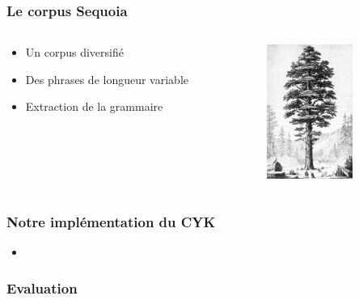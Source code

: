 \documentclass{beamer}
\begin{document}
\begin{frame}
  \frametitle{Le corpus Sequoia}
  \begin{columns}
  \begin{column}{0.5\textwidth}
    \begin{itemize}
     \item{ Un corpus diversifié}
     \item{ Des phrases de longueur variable}
     \item{ Extraction de la grammaire}
     
     
    \end{itemize}
   
  \end{column}
  
  \begin{column}{0.5\textwidth}
  \includegraphics[width=80pt,]{PSM_V03_D341_Sequoia_gigantea_of_california.jpg}  
  \end{column}

  \end{columns}

\end{frame}

\begin{frame}
\frametitle{Notre implémentation du CYK}

\begin{itemize}
 \item{}
\end{itemize}


 
\end{frame}

\begin{frame}
\frametitle{Evaluation}

\end{frame}
\end{document}
